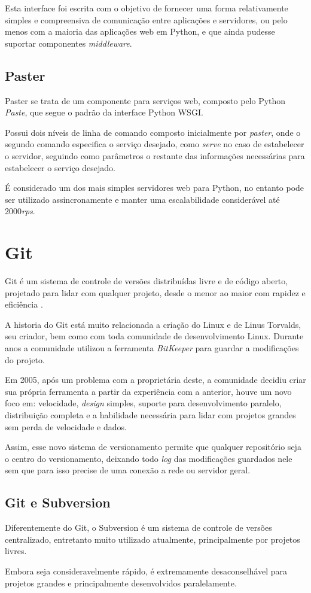 Esta interface foi escrita com o objetivo de fornecer uma forma relativamente simples e compreensiva de comunicação entre aplicações e servidores, ou pelo menos com a maioria das aplicações web em Python, e que ainda pudesse suportar componentes \textit{middleware}.


\subsection{Paster}

Paster se trata de um componente para serviços web, composto pelo Python \textit{Paste}, que segue o padrão da interface Python WSGI.

Possui dois níveis de linha de comando composto inicialmente por \textit{paster}, onde o segundo comando especifica o serviço desejado, como \textit{serve} no caso de estabelecer o servidor, seguindo como parâmetros o restante das informações necessárias para estabelecer o serviço desejado.

É considerado um dos mais simples servidores web para Python, no entanto pode ser utilizado assincronamente e manter uma escalabilidade considerável até 2000\textit{rps}.


\section{Git}

Git é um sistema de controle de versões distribuídas livre e de código aberto, projetado para lidar com qualquer projeto, desde o menor ao maior com rapidez e eficiência \cite{SOFTWARE-FREEDOM-CONSERVANCY}.

A historia do Git está muito relacionada a criação do Linux e de Linus Torvalds, seu criador, bem como com toda comunidade de desenvolvimento Linux. Durante anos a comunidade utilizou a ferramenta \textit{BitKeeper} para guardar a modificações do projeto.

Em 2005, após um problema com a proprietária deste, a comunidade decidiu criar sua própria ferramenta a partir da experiência com a anterior, houve um novo foco em: velocidade, \textit{design} simples, suporte para desenvolvimento paralelo, distribuição completa e a habilidade necessária para lidar com projetos grandes sem perda de velocidade e dados.

Assim, esse novo sistema de versionamento permite que qualquer repositório seja o centro do versionamento, deixando todo \textit{log} das modificações guardados nele sem que para isso precise de uma conexão a rede ou servidor geral.


\subsection{Git e Subversion}

Diferentemente do Git, o Subversion é um sistema de controle de versões centralizado, entretanto muito utilizado atualmente, principalmente por projetos livres.

Embora seja consideravelmente rápido, é extremamente desaconselhável para projetos grandes e principalmente desenvolvidos paralelamente.
